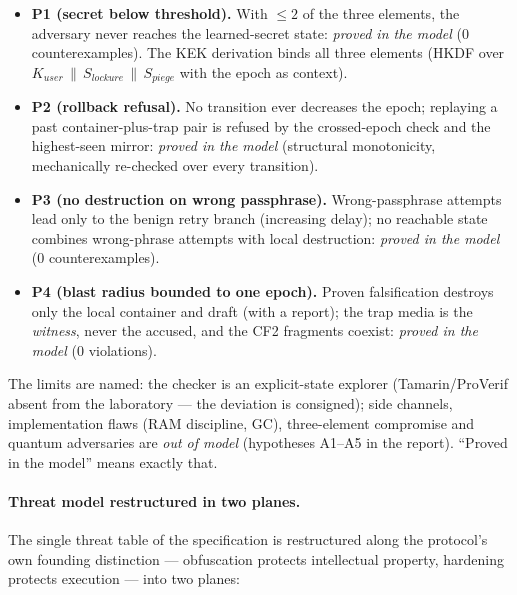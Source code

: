 \documentclass[11pt,a4paper]{article}
\begin{document}
\begin{itemize}
\item \textbf{P1 (secret below threshold).} With $\le 2$ of the three
elements, the adversary never reaches the learned-secret state:
\emph{proved in the model} (0 counterexamples). The KEK derivation
binds all three elements (HKDF over $K_{user}\,\|\,S_{lockure}\,\|\,
S_{piege}$ with the epoch as context).
\item \textbf{P2 (rollback refusal).} No transition ever decreases the
epoch; replaying a past container-plus-trap pair is refused by the
crossed-epoch check and the highest-seen mirror: \emph{proved in the
model} (structural monotonicity, mechanically re-checked over every
transition).
\item \textbf{P3 (no destruction on wrong passphrase).} Wrong-passphrase
attempts lead only to the benign retry branch (increasing delay); no
reachable state combines wrong-phrase attempts with local destruction:
\emph{proved in the model} (0 counterexamples).
\item \textbf{P4 (blast radius bounded to one epoch).} Proven
falsification destroys only the local container and draft (with a
report); the trap media is the \emph{witness}, never the accused, and
the CF2 fragments coexist: \emph{proved in the model} (0 violations).
\end{itemize}

The limits are named: the checker is an explicit-state explorer
(Tamarin/ProVerif absent from the laboratory --- the deviation is
consigned); side channels, implementation flaws (RAM discipline, GC),
three-element compromise and quantum adversaries are \emph{out of
model} (hypotheses A1--A5 in the report). ``Proved in the model'' means
exactly that.

\paragraph{Threat model restructured in two planes.} The single threat
table of the specification is restructured along the protocol's own
founding distinction --- obfuscation protects intellectual property,
hardening protects execution --- into two planes:
\end{document}
